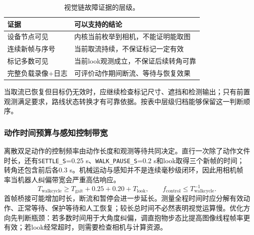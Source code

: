 \begin{table}[H]\centering\small\begin{tabularx}{\linewidth}{p{28mm}Y}\toprule 证据 & 可以支持的结论\\\midrule
设备节点可见 & 内核当前枚举到相机，不能证明能取图\\
连续新帧与序号 & 当前取流持续，不保证标记一定有效\\
标记多数可见 & 当前look观测成立，不保证后续转角可靠\\
完整负载录像+日志 & 可评价动作期间断流、等待与恢复效果\\\bottomrule\end{tabularx}\caption{视觉链故障证据的层级。}\end{table}

当取流已恢复但目标仍无效时，应继续检查标记尺寸、遮挡和检测输出；只有前置观测满足要求，路线状态转换才有可靠依据。按表中层级归档能够保留这一判断顺序。


\subsubsection{动作时间预算与感知控制带宽}
离散双足动作的控制频率由动作长度和观测等待共同决定。直行一次除了动作文件时长，还有\texttt{SETTLE\_\allowbreak S}=0.25 s、\texttt{WALK\_\allowbreak PAUSE\_\allowbreak S}=0.2 s和look取得三个新帧的时间；转角还包含前后各0.3 s。机械运动与感知并不是连续毫秒级闭环，因此用相机帧率当机器人纠偏带宽会严重高估响应。
\begin{equation}
T_{\mathrm{walkcycle}}\ge T_{\mathrm{gait}}+0.25+0.20+T_{\mathrm{look}},\qquad f_{\mathrm{control}}\le T_{\mathrm{walkcycle}}^{-1}.
\end{equation}
首帧桥接可能增加时长，断流和暂停会进一步延长。测量全程时间时应分解有效动作、正常等待、保护等待和人工恢复；较长总时间不必然表明视觉运算慢。优化方向先判断瓶颈：若多数时间用于大角度纠偏，调直抱物步态比提高图像线程帧率更有效；若look经常超时，则需要检查相机与计算资源。

